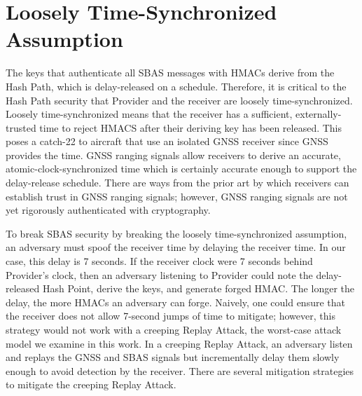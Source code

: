 \documentclass[letterpaper,times]{IONconf/IONconf}
\begin{document}
\section{Loosely Time-Synchronized Assumption}

The keys that authenticate all SBAS messages with HMACs derive from the Hash Path, which is delay-released on a schedule.
Therefore, it is critical to the Hash Path security that Provider and the receiver are loosely time-synchronized.
Loosely time-synchronized means that the receiver has a sufficient, externally-trusted time to reject HMACS after their deriving key has been released.
This poses a catch-22 to aircraft that use an isolated GNSS receiver since GNSS provides the time.
GNSS ranging signals allow receivers to derive an accurate, atomic-clock-synchronized time which is certainly accurate enough to support the delay-release schedule.
There are ways from the prior art by which receivers can establish trust in GNSS ranging signals\cite{Psiaki2016,Fernandez-Hernandez2018}; however, GNSS ranging signals are not yet rigorously authenticated with cryptography.

To break SBAS security by breaking the loosely time-synchronized assumption, an adversary must spoof the receiver time by delaying the receiver time.
In our case, this delay is 7 seconds.
If the receiver clock were 7 seconds behind Provider's clock, then an adversary listening to Provider could note the delay-released Hash Point, derive the keys, and generate forged HMAC.
The longer the delay, the more HMACs an adversary can forge.
Naively, one could ensure that the receiver does not allow 7-second jumps of time to mitigate; however, this strategy would not work with a creeping Replay Attack, the worst-case attack model we examine in this work.
In a creeping Replay Attack, an adversary listen and replays the GNSS and SBAS signals but incrementally delay them slowly enough to avoid detection by the receiver.
There are several mitigation strategies to mitigate the creeping Replay Attack.
\end{document}
